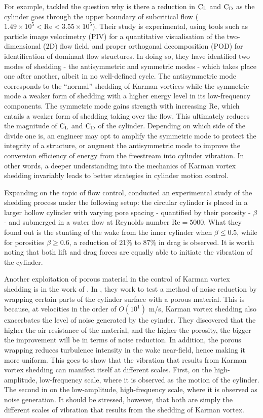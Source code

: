 \documentclass[oneside]{utmthesis}
\begin{document}
For example, \citet{Desai2020} tackled the question why is there a reduction in $\text{C}_{\text{L}}$ and $\text{C}_{\text{D}}$ as the cylinder goes through the upper boundary of subcritical flow ($1.49 \times 10^{5} < \text{Re} < 3.55 \times 10^{5}$). Their study is experimental, using tools such as particle image velocimetry (PIV) for a quantitative visualisation of the two-dimensional (2D) flow field, and proper orthogonal decomposition (POD) for identification of dominant flow structures. In doing so, they have identified two modes of shedding - the antisymmetric and symmetric modes - which takes place one after another, albeit in no well-defined cycle. The antisymmetric mode corresponds to the ``normal'' shedding of Karman vortices while the symmetric mode a weaker form of shedding with a higher energy level in its low-frequency components. The symmetric mode gains strength with increasing Re, which entails a weaker form of shedding taking over the flow. This ultimately reduces the magnitude of $\text{C}_{\text{L}}$ and $\text{C}_{\text{D}}$ of the cylinder. Depending on which side of the divide one is, an engineer may opt to amplify the symmetric mode to protect the integrity of a structure, or augment the antisymmetric mode to improve the conversion efficiency of energy from the freestream into cylinder vibration. In other words, a deeper understanding into the mechanics of Karman vortex shedding invariably leads to better strategies in cylinder motion control.

Expanding on the topic of flow control, \citet{Durhasan2019} conducted an experimental study of the shedding process under the following setup: the circular cylinder is placed in a larger hollow cylinder with varying pore spacing - quantified by their porosity - $\beta$ - and submerged in a water flow at Reynolds number $\text{Re} = 5000$. What they found out is the stunting of the wake from the inner cylinder when $\beta \leq 0.5$, while for porosities $\beta \geq 0.6$, a reduction of 21\% to 87\% in drag is observed. It is worth noting that both lift and drag forces are equally able to initiate the vibration of the cylinder.

Another exploitation of porous material in the control of Karman vortex shedding is in the work of \citet{Geyer2020}. In \citet{Geyer2020}, they work to test a method of noise reduction by wrapping certain parts of the cylinder surface with a porous material. This is because, at velocities in the order of $O(10^{1})$ m/s, Karman vortex shedding also exacerbates the level of noise generated by the cyinder. They discovered that the higher the air resistance of the material, and the higher the porosity, the bigger the improvement will be in terms of noise reduction. In addition, the porous wrapping reduces turbulence intensity in the wake near-field, hence making it more uniform.
This goes to show that the vibration that results from Karman vortex shedding can manifest itself at different scales. First, on the high-amplitude, low-frequency scale, where it is observed as the motion of the cylinder. The second in on the low-amplitude, high-frequency scale, where it is observed as noise generation. It should be stressed, however, that both are simply the different scales of vibration that results from the shedding of Karman vortex.
\end{document}
